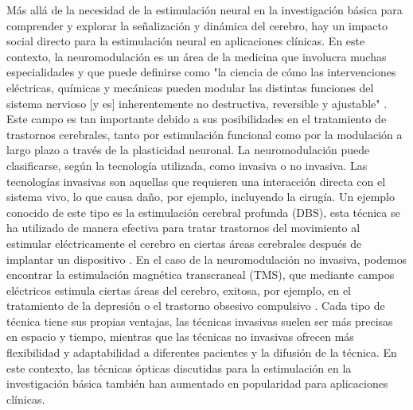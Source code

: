 Más allá de la necesidad de la estimulación neural en la investigación básica para comprender y explorar la señalización y dinámica del cerebro, hay un impacto social directo para la estimulación neural en aplicaciones clínicas. En este contexto, la neuromodulación es un área de la medicina que involucra muchas especialidades y que puede definirse como "la ciencia de cómo las intervenciones eléctricas, químicas y mecánicas pueden modular las distintas funciones del sistema nervioso [y es] inherentemente no destructiva, reversible y ajustable" \parencite{krames_neuromodulation_2009}. Este campo es tan importante debido a sus posibilidades en el tratamiento de trastornos cerebrales, tanto por estimulación funcional como por la modulación a largo plazo a través de la plasticidad neuronal. La neuromodulación puede clasificarse, según la tecnología utilizada, como invasiva o no invasiva. Las tecnologías invasivas son aquellas que requieren una interacción directa con el sistema vivo, lo que causa daño, por ejemplo, incluyendo la cirugía. Un ejemplo conocido de este tipo es la estimulación cerebral profunda (DBS), esta técnica se ha utilizado de manera efectiva para tratar trastornos del movimiento al estimular eléctricamente el cerebro en ciertas áreas cerebrales después de implantar un dispositivo \parencite{limousin_long-term_2019, hariz_deep_2022}. En el caso de la neuromodulación no invasiva, podemos encontrar la estimulación magnética transcraneal (TMS), que mediante campos eléctricos estimula ciertas áreas del cerebro, exitosa, por ejemplo, en el tratamiento de la depresión o el trastorno obsesivo compulsivo \parencite{valero-cabre_transcranial_2017, clarke_patients_2018}. Cada tipo de técnica tiene sus propias ventajas, las técnicas invasivas suelen ser más precisas en espacio y tiempo, mientras que las técnicas no invasivas ofrecen más flexibilidad y adaptabilidad a diferentes pacientes y la difusión de la técnica. En este contexto, las técnicas ópticas discutidas para la estimulación en la investigación básica también han aumentado en popularidad para aplicaciones clínicas.
